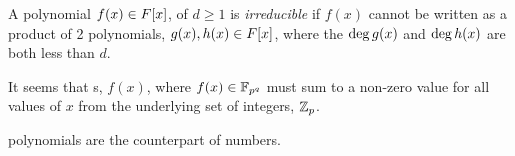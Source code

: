 \begin{definition}[Irreducible]\label{def:Irreducible_Polynomial}
  A polynomial $f(x) \in F[x]$, of  $d \geq 1$ is \emph{irreducible} if $f(x)$ cannot be written as a product of 2 polynomials, $g(x), h(x) \in F[x]$, where the $\operatorname{\operatorname{deg}} g(x)$ and $\operatorname{\operatorname{deg}} h(x)$ are both less than $d$.

  \begin{remark}\label{rmk:Irreducible_Polynomials_Sum_to_Zero}
    It seems that  s, $f(x)$, where $f(x) \in \mathbb{F}_{p^{q}}$ must sum to a non-zero value for all values of $x$ from the underlying set of integers, $\operatorname{\mathbb{Z}}_{p}$.
  \end{remark}

  \begin{remark}\label{rmk:Irreducible_Polynomials_and_Prime_Numbers}
     polynomials are the  counterpart of  numbers.
  \end{remark}
\end{definition}

